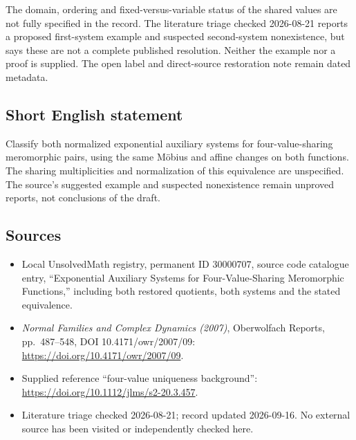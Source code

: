 \documentclass[11pt]{article}
\begin{document}
The domain, ordering and fixed-versus-variable status of the shared values are not fully specified in the record. The literature triage checked 2026-08-21 reports a proposed first-system example and suspected second-system nonexistence, but says these are not a complete published resolution. Neither the example nor a proof is supplied. The open label and direct-source restoration note remain dated metadata.
\subsection{Short English statement}
Classify both normalized exponential auxiliary systems for four-value-sharing meromorphic pairs, using the same Möbius and affine changes on both functions. The sharing multiplicities and normalization of this equivalence are unspecified. The source's suggested example and suspected nonexistence remain unproved reports, not conclusions of the draft.
\subsection{Sources}
\begin{itemize}
\item Local UnsolvedMath registry, permanent ID 30000707, source code catalogue entry, ``Exponential Auxiliary Systems for Four-Value-Sharing Meromorphic Functions,'' including both restored quotients, both systems and the stated equivalence.
\item \emph{Normal Families and Complex Dynamics (2007)}, Oberwolfach Reports, pp.\ 487--548, DOI 10.4171/owr/2007/09: \url{https://doi.org/10.4171/owr/2007/09}.
\item Supplied reference ``four-value uniqueness background'': \url{https://doi.org/10.1112/jlms/s2-20.3.457}.
\item Literature triage checked 2026-08-21; record updated 2026-09-16. No external source has been visited or independently checked here.
\end{itemize}
\end{document}
